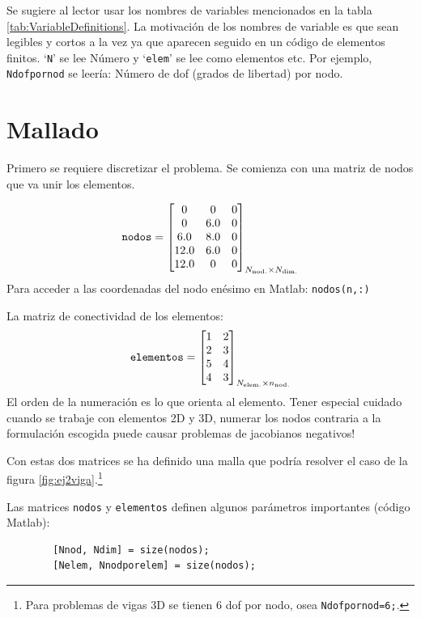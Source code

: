 \documentclass[11pt, a4paper,titlepage]{article}
\newcommand{\rmfont}[1]{{\fontfamily{ptm}\selectfont%
#1}}
\newcommand{\Matlab}{\rmfont{\sc Matlab}}
\begin{document}
Se sugiere al lector usar los nombres de variables mencionados en la tabla \ref{tab:VariableDefinitions}. La motivación de los nombres de variable es que sean legibles y cortos a la vez ya que aparecen seguido en un código de elementos finitos. `\texttt{N}' se lee Número y `\texttt{elem}' se lee como elementos etc. Por ejemplo, \texttt{Ndofpornod} se leería: Número de dof (grados de libertad) por nodo.

\section{Mallado}
Primero se requiere discretizar el problema. Se comienza con una matriz de nodos que va unir los elementos. 

\begin{equation}
	\texttt{nodos} = \begin{bmatrix}
	0 & 0 & 0 \\
	0 & 6.0 & 0 \\
	6.0 & 8.0 & 0 \\
	12.0 & 6.0 & 0 \\
	12.0 & 0 & 0
	\end{bmatrix}_{ N_{\mathrm{nod.}} \times N_{\mathrm{dim.}} }
\end{equation}
Para acceder a las coordenadas del nodo enésimo en \Matlab: \texttt{nodos(n,:)}

La matriz de conectividad de los elementos:
\begin{equation} \label{eq:MatrizElementosEjemplo}
\texttt{elementos} = \begin{bmatrix}
1 & 2  \\
2 & 3  \\
5 & 4 \\
4 & 3 
\end{bmatrix}_{ N_{\mathrm{elem.}} \times n_{\mathrm{nod.}} } 
\end{equation}
El orden de la numeración es lo que orienta al elemento. Tener especial cuidado cuando se trabaje con elementos 2D y 3D, numerar los nodos contraria a la formulación escogida puede causar problemas de jacobianos negativos!

Con estas dos matrices se ha definido una malla que podría resolver el caso de la figura \ref{fig:ej2viga}.\footnote{Para problemas de vigas 3D se tienen 6 dof por nodo, osea \texttt{Ndofpornod=6;}.}

Las matrices \texttt{nodos} y \texttt{elementos} definen algunos parámetros importantes (código \Matlab):
\begin{verbatim}
	    [Nnod, Ndim] = size(nodos);
	    [Nelem, Nnodporelem] = size(nodos);
\end{verbatim}
\end{document}
